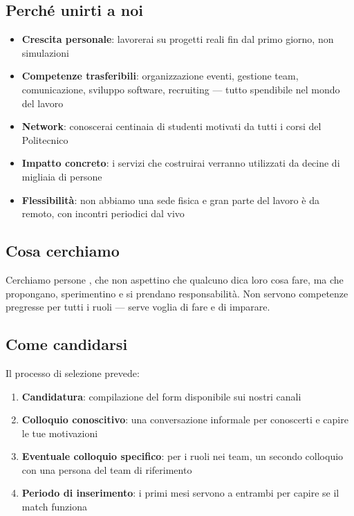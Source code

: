 \documentclass[report]{core/polinetwork}
\begin{document}
\subsection{Perché unirti a noi}

\begin{itemize}
  \item \textbf{Crescita personale}: lavorerai su progetti reali
    fin dal primo giorno, non simulazioni
  \item \textbf{Competenze trasferibili}: organizzazione eventi,
    gestione team, comunicazione, sviluppo software, recruiting
    --- tutto spendibile nel mondo del lavoro
  \item \textbf{Network}: conoscerai centinaia di studenti
    motivati da tutti i corsi del Politecnico
  \item \textbf{Impatto concreto}: i servizi che costruirai
    verranno utilizzati da decine di migliaia di persone
  \item \textbf{Flessibilità}: non abbiamo una sede fisica e gran
    parte del lavoro è da remoto, con incontri periodici
    dal vivo
\end{itemize}

\subsection{Cosa cerchiamo}

Cerchiamo persone , che non aspettino che qualcuno
dica loro cosa fare, ma che propongano, sperimentino e si prendano
responsabilità. Non servono competenze pregresse per tutti i ruoli
--- serve voglia di fare e di imparare.

\subsection{Come candidarsi}

Il processo di selezione prevede:

\begin{enumerate}
  \item \textbf{Candidatura}: compilazione del form disponibile
    sui nostri canali
  \item \textbf{Colloquio conoscitivo}: una conversazione informale
    per conoscerti e capire le tue motivazioni
  \item \textbf{Eventuale colloquio specifico}: per i ruoli nei
    team, un secondo colloquio con una persona del team
    di riferimento
  \item \textbf{Periodo di inserimento}: i primi mesi servono a
    entrambi per capire se il match funziona
\end{enumerate}
\end{document}
